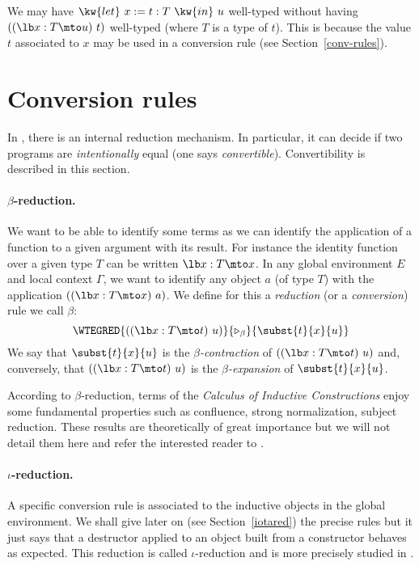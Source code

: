 \Rem We may have $\kw{let}~x:=t:T~\kw{in}~u$
well-typed without having $((\lb x:T\mto u)~t)$ well-typed (where
$T$ is a type of $t$). This is because the value $t$ associated to $x$
may be used in a conversion rule (see Section~\ref{conv-rules}).

\section[Conversion rules]{Conversion rules
\label{conv-rules}}

In \CIC, there is an internal reduction mechanism. In particular, it
can decide if two programs are {\em intentionally} equal (one
says {\em convertible}). Convertibility is described in this section.

\paragraph[$\beta$-reduction.]{$\beta$-reduction.\label{beta}}

We want to be able to identify some terms as we can identify the
application of a function to a given argument with its result. For
instance the identity function over a given type $T$ can be written
$\lb x:T\mto x$. In any global environment $E$ and local context $\Gamma$, we want to identify any object $a$ (of type $T$) with the
application $((\lb x:T\mto x)~a)$. We define for this a {\em reduction} (or a
{\em conversion}) rule we call $\beta$:
\[ \WTEGRED{((\lb x:T\mto
  t)~u)}{\triangleright_{\beta}}{\subst{t}{x}{u}} \] 
We say that $\subst{t}{x}{u}$ is the {\em $\beta$-contraction} of
$((\lb x:T\mto t)~u)$ and, conversely, that $((\lb x:T\mto t)~u)$
is the {\em $\beta$-expansion} of $\subst{t}{x}{u}$.

According to $\beta$-reduction, terms of the {\em Calculus of
  Inductive Constructions} enjoy some fundamental properties such as
confluence, strong normalization, subject reduction. These results are
theoretically of great importance but we will not detail them here and
refer the interested reader to \cite{Coq85}.

\paragraph[$\iota$-reduction.]{$\iota$-reduction.\label{iota}}
A specific conversion rule is associated to the inductive objects in
the global environment.  We shall give later on (see Section~\ref{iotared}) the
precise rules but it just says that a destructor applied to an object
built from a constructor behaves as expected.  This reduction is
called $\iota$-reduction and is more precisely studied in
\cite{Moh93,Wer94}.


